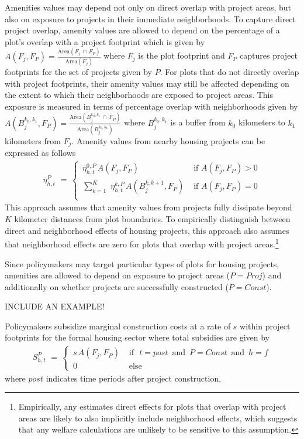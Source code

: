 \documentclass[12pt]{article}
\begin{document}
Amenities values may depend not only on direct overlap with project areas, but also on exposure to projects in their immediate neighborhoods.  To capture direct project overlap, amenity values are allowed to depend on the percentage of a plot's overlap with a project footprint which is given by $A(F_j, F_P) = \frac{ \text{Area} ( F_{j} \, \cap \, F_{P} )}{\text{Area}(F_j)}$ where $F_j$ is the plot footprint and $F_{P}$ captures project footprints for the set of projects given by $P$.  For plots that do not directly overlap with project footprints, their amenity values may still be affected depending on the extent to which their neighborhoods are exposed to project areas.  This exposure is measured in terms of percentage overlap with neighborhoods given by $A(B^{k_0,k_1}_j, F_P) = \frac{ \text{Area}(B^{k_0,k_1}_j \, \cap \, F_{P}) }{\text{Area}(B^{k_0,k_1}_j)}$ where $B^{k_0,k_1}_j$ is a buffer from $k_0$ kilometers to $k_1$ kilometers from $F_j$.  Amenity values from nearby housing projects can be expressed as follows
\begin{align*}
\overline{\eta}_{h,t}^{P} \, \, = \,
\begin{cases}
 \, \eta^{0,P}_{h,t} \, A(F_j, F_P)  &\text{ if }   A(F_j, F_P) > 0 \\
 \, \sum_{k=1}^{K} \, \, \eta^{k,P}_{h,t} \, A(B^{k,k+1}_j, F_P) & \text{ if } A(F_j, F_P)=0 \\
\end{cases}
\end{align*}
This approach assumes that amenity values from projects fully dissipate beyond $K$ kilometer distances from plot boundaries.  To empirically distinguish between direct and neighborhood effects of housing projects, this approach also assumes that neighborhood effects are zero for plots that overlap with project areas.\footnote{Empirically, any estimates direct effects for plots that overlap with project areas are likely to also implicitly include neighborhood effects, which suggests that any welfare calculations are unlikely to be sensitive to this assumption.}

Since policymakers may target particular types of plots for housing projects, amenities are allowed to depend on exposure to project areas ($P=Proj$) and additionally on whether projects are successfully constructed ($P=Const$).

INCLUDE AN EXAMPLE! 

Policymakers subsidize marginal construction costs at a rate of $s$ within project footprints for the formal housing sector where total subsidies are given by 
\begin{align*}
S^{P}_{h,t} \, \, = \, 
\begin{cases}
\, s \, A(F_j, F_P)  & \text{ if }\,\, t = post \, \text{ and } \, P = Const \, \text{ and } \, h = f \\
\, 0  & \text{ else }
\end{cases}
\end{align*}
where $post$ indicates time periods after project construction.  
\end{document}
